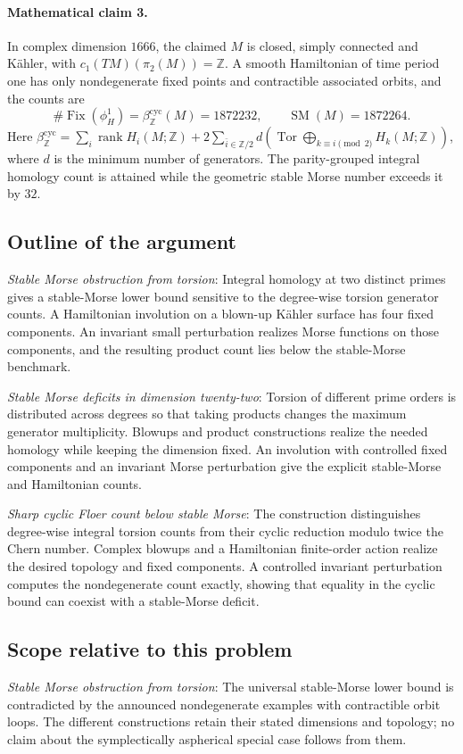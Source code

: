 \documentclass[11pt]{article}
\begin{document}
\paragraph{Mathematical claim 3.} In complex dimension $1666$, the claimed $M$ is closed, simply connected and K\"ahler, with $c_1(TM)(\pi_2(M))=\mathbb Z$. A smooth Hamiltonian of time period one has only nondegenerate fixed points and contractible associated orbits, and the counts are \[\#\operatorname{Fix}(\phi_H^1)=\beta_{\mathbb Z}^{\mathrm{cyc}}(M)=1872232,\qquad\operatorname{SM}(M)=1872264.\] Here $\beta_{\mathbb Z}^{\mathrm{cyc}}=\sum_i\operatorname{rank}H_i(M;\mathbb Z)+2\sum_{\bar i\in\mathbb Z/2}d(\operatorname{Tor}\bigoplus_{k\equiv i\pmod2}H_k(M;\mathbb Z))$, where $d$ is the minimum number of generators. The parity-grouped integral homology count is attained while the geometric stable Morse number exceeds it by $32$.

\subsection{Outline of the argument}
\textit{Stable Morse obstruction from torsion}: Integral homology at two distinct primes gives a stable-Morse lower bound sensitive to the degree-wise torsion generator counts. A Hamiltonian involution on a blown-up Kähler surface has four fixed components. An invariant small perturbation realizes Morse functions on those components, and the resulting product count lies below the stable-Morse benchmark.

\textit{Stable Morse deficits in dimension twenty-two}: Torsion of different prime orders is distributed across degrees so that taking products changes the maximum generator multiplicity. Blowups and product constructions realize the needed homology while keeping the dimension fixed. An involution with controlled fixed components and an invariant Morse perturbation give the explicit stable-Morse and Hamiltonian counts.

\textit{Sharp cyclic Floer count below stable Morse}: The construction distinguishes degree-wise integral torsion counts from their cyclic reduction modulo twice the Chern number. Complex blowups and a Hamiltonian finite-order action realize the desired topology and fixed components. A controlled invariant perturbation computes the nondegenerate count exactly, showing that equality in the cyclic bound can coexist with a stable-Morse deficit.

\subsection{Scope relative to this problem}
\textit{Stable Morse obstruction from torsion}: The universal stable-Morse lower bound is contradicted by the announced nondegenerate examples with contractible orbit loops. The different constructions retain their stated dimensions and topology; no claim about the symplectically aspherical special case follows from them.
\end{document}
